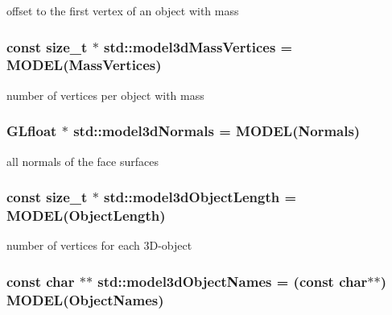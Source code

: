 offset to the first vertex of an object with mass 

\hypertarget{namespacestd_aea2c80cb8809cdc4c2f3b2b0961d3036}{}
\subsubsection[{model3d\+Mass\+Vertices}]{\setlength{\rightskip}{0pt plus 5cm}const size\+\_\+t $\ast$ std\+::model3d\+Mass\+Vertices = {\bf M\+O\+D\+E\+L}(Mass\+Vertices)}\label{namespacestd_aea2c80cb8809cdc4c2f3b2b0961d3036}


number of vertices per object with mass 

\hypertarget{namespacestd_ab62b34140cca60f41eac455edd195e5a}{}
\subsubsection[{model3d\+Normals}]{\setlength{\rightskip}{0pt plus 5cm}G\+Lfloat $\ast$ std\+::model3d\+Normals = {\bf M\+O\+D\+E\+L}(Normals)}\label{namespacestd_ab62b34140cca60f41eac455edd195e5a}


all normals of the face surfaces 

\hypertarget{namespacestd_a678ef71cdf9ee666493694bfcf4d238f}{}
\subsubsection[{model3d\+Object\+Length}]{\setlength{\rightskip}{0pt plus 5cm}const size\+\_\+t $\ast$ std\+::model3d\+Object\+Length = {\bf M\+O\+D\+E\+L}(Object\+Length)}\label{namespacestd_a678ef71cdf9ee666493694bfcf4d238f}


number of vertices for each 3\+D-\/object 

\hypertarget{namespacestd_af3ac1c474abd23473b8fca32585ffe52}{}
\subsubsection[{model3d\+Object\+Names}]{\setlength{\rightskip}{0pt plus 5cm}const char $\ast$$\ast$ std\+::model3d\+Object\+Names = (const char$\ast$$\ast$) {\bf M\+O\+D\+E\+L}(Object\+Names)}\label{namespacestd_af3ac1c474abd23473b8fca32585ffe52}


